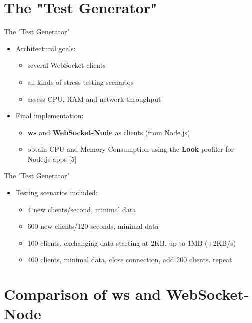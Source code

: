 \documentclass{soa.cs.pub.ro}
\begin{document}
\section{The "Test Generator"}

\begin{frame}{The "Test Generator"}
  \begin{itemize}
    \item Architectural goals:
      \begin{itemize}
        \item several WebSocket clients
        \item all kinds of stress testing scenarios
        \item assess CPU, RAM and network throughput
      \end{itemize}
    \item Final implementation:
      \begin{itemize}
        \item \textbf{ws} and \textbf{WebSocket-Node} as clients (from Node.js)
        \item obtain CPU and Memory Consumption using the \textbf{Look}
              profiler for Node.js apps [5]
      \end{itemize}
  \end{itemize}
\end{frame}

\begin{frame}{The "Test Generator"}
  \begin{itemize}
    \item Testing scenarios included:
      \begin{itemize}
        \item 4 new clients/second, minimal data
        \item 600 new clients/120 seconds, minimal data
        \item 100 clients, exchanging data starting at 2KB, up to 1MB (+2KB/s)
        \item 400 clients, minimal data, close connection,
              add 200 clients. repeat
      \end{itemize}
  \end{itemize}
\end{frame}

\section{Comparison of ws and WebSocket-Node}
\end{document}
